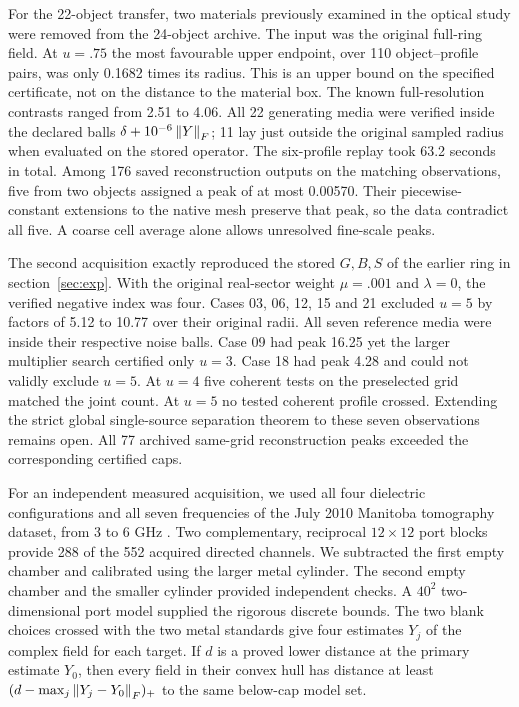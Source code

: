 \documentclass[anonymous,12pt]{iopjournal}
\theoremstyle{remark}\newtheorem{remark}[theorem]{Remark}
\numberwithin{equation}{section}
\begin{document}
For the 22-object transfer, two materials previously examined in the optical study were removed from the 24-object archive. The input was the original full-ring field. At $u=.75$ the most favourable upper endpoint, over 110 object--profile pairs, was only 0.1682 times its radius. This is an upper bound on the specified certificate, not on the distance to the material box. The known full-resolution contrasts ranged from 2.51 to 4.06. All 22 generating media were verified inside the declared balls $\delta+10^{-6}\left\|Y\right\|_F$; 11 lay just outside the original sampled radius when evaluated on the stored operator. The six-profile replay took 63.2 seconds in total. Among 176 saved reconstruction outputs on the matching observations, five from two objects assigned a peak of at most 0.00570. Their piecewise-constant extensions to the native mesh preserve that peak, so the data contradict all five. A coarse cell average alone allows unresolved fine-scale peaks.

The second acquisition exactly reproduced the stored $G,B,S$ of the earlier ring in section~\ref{sec:exp}. With the original real-sector weight $\mu=.001$ and $\lambda=0$, the verified negative index was four. Cases 03, 06, 12, 15 and 21 excluded $u=5$ by factors of 5.12 to 10.77 over their original radii. All seven reference media were inside their respective noise balls. Case 09 had peak 16.25 yet the larger multiplier search certified only $u=3$. Case 18 had peak 4.28 and could not validly exclude $u=5$. At $u=4$ five coherent tests on the preselected grid matched the joint count. At $u=5$ no tested coherent profile crossed. Extending the strict global single-source separation theorem to these seven observations remains open. All 77 archived same-grid reconstruction peaks exceeded the corresponding certified caps.

For an independent measured acquisition, we used all four dielectric configurations and all seven frequencies of the July 2010 Manitoba tomography dataset, from 3 to 6 GHz \cite{manitoba}. Two complementary, reciprocal $12\times12$ port blocks provide 288 of the 552 acquired directed channels. We subtracted the first empty chamber and calibrated using the larger metal cylinder. The second empty chamber and the smaller cylinder provided independent checks. A $40^2$ two-dimensional port model supplied the rigorous discrete bounds. The two blank choices crossed with the two metal standards give four estimates $Y_j$ of the complex field for each target. If $d$ is a proved lower distance at the primary estimate $Y_0$, then every field in their convex hull has distance at least $(d-\max_j\left\|Y_j-Y_0\right\|_F)_+$ to the same below-cap model set.
\end{document}
